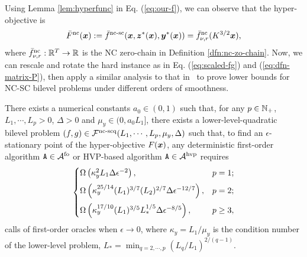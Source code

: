 \documentclass{article}
\begin{document}
Using Lemma \ref{lem:hyperfunc} in Eq. (\ref{eq:our-f}), we can observe that the hyper-objective is
\begin{align*}
\bar F^{\rm nc}({\bm{x}}) := \bar f^{\text{nc-sc}}({\bm{x}},{\bm{z}}^*({\bm{x}}), {\bm{y}}^*({\bm{x}}))= \bar f^{\rm nc}_{\nu, r}(K^{3/2} {\bm{x}}),
\end{align*}
where $\bar f^{\rm nc}_{\nu, r}: {\mathbb{R}}^T \rightarrow {\mathbb{R}}$ is the NC zero-chain in Definition \ref{dfn:nc-zo-chain}. 
Now, we can rescale and rotate the hard instance as in Eq. (\ref{eq:scaled-fg}) and (\ref{eq:dfn-matrix-P}), then apply a similar analysis to that in~\citep[Theorem 2]{carmon2021lower}
to prove lower bounds for NC-SC bilevel problems under different orders of smoothness.



\begin{thm} \label{thm:NC-SC}
There exists a numerical constants $a_0 \in (0,1)$ such that, 
for any $p \in {\mathbb{N}}_+$, $L_1,\cdots,L_p>0$, $\Delta >0$ and $\mu_y \in (0, a_0 L_1]$, there exists a lower-level-quadratic bilevel problem $(f, g) \in {\mathcal{F}}^{\text{nc-scq}}(L_1,\cdots,L_p, \mu_y, \Delta)$ such that, to find an $\epsilon$-stationary point of the  hyper-objective  $F({\bm{x}})$, any deterministic first-order algorithm $\texttt{A} \in {\mathcal{A}}^{\rm fo}$ or HVP-based algorithm $\texttt{A} \in {\mathcal{A}}^{\rm hvp}$ requires 
    \begin{align*}
        \begin{cases}
        \vspace{2mm} 
             \Omega \left( \kappa_y^{2} 
             L_1 \Delta \epsilon^{-2} \right), &p=1; \\
             \vspace{2mm} 
             \Omega \left( \kappa_y^{25/14} (L_1)^{3/7} ( L_2)^{2/7} \Delta \epsilon^{-12/7}    \right), & p =2; \\ 
             \Omega \left( \kappa_y^{17/10} (L_1)^{3/5} L_*^{1/5} \Delta \epsilon^{-8/5} \right), & p \ge 3,
        \end{cases}
    \end{align*}
    calls of first-order oracles when $\epsilon \rightarrow 0$,
    where $\kappa_y = L_1/\mu_y$ is the condition number of the lower-level problem, $L_* = \min_{q=2, \cdots, p}  \left( {L_q}/{L_1 } \right)^{2/(q-1)}$.
\end{thm}
\end{document}

